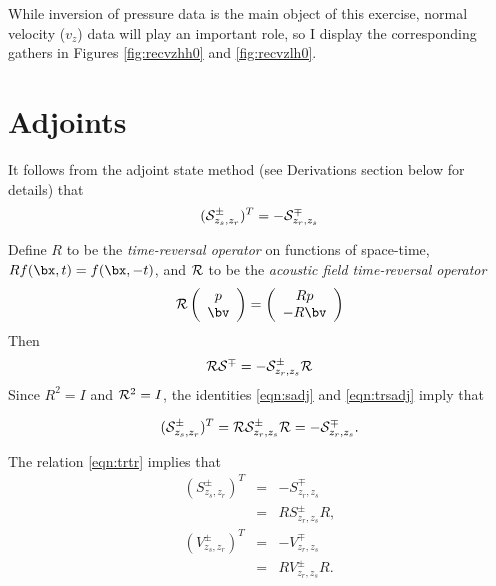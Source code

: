 While inversion of pressure data is the main object of this exercise,
normal velocity ($v_z$) data will play an important role, so I display
the corresponding gathers in Figures \ref{fig:recvzhh0} and \ref{fig:recvzlh0}.



\section{Adjoints}

It follows from the adjoint state method (see Derivations section
below for details) that
\begin{equation}
  \label{eqn:sadj1}
  ({\cal S}^{\pm}_{z_s, z_r})^T = -{\cal S}^{\mp}_{z_r,z_s}
\end{equation}

Define $R$ to be the {\em time-reversal operator} on functions of
space-time, $Rf(\bx,t) = f(\bx,-t)$, and ${\cal R}$ to be the {\em
  acoustic field time-reversal operator}
\begin{equation}
  \label{eqn:trdef}
  {\cal R} \left(
    \begin{array}{c}
      p\\
      \bv
    \end{array}
  \right) =
  \left(
    \begin{array}{c}
      Rp\\
      -R\bv
    \end{array}
  \right)
\end{equation}
Then 
\begin{equation}
  \label{eqn:trsadj}
  {\cal R}{\cal S}^{\mp} = -{\cal S}^{\pm}_{z_r,z_s}{\cal R}
\end{equation}
Since $R^2 = I$ and ${\cal R}^2 = I$, the identities \ref{eqn:sadj} and \ref{eqn:trsadj} imply that

\begin{equation} 
  \label{eqn:trtr}
 ({\cal S}^{\pm}_{z_s,z_r})^T = {\cal R}{\cal S}_{z_r,z_s}^{\pm}{\cal R}=
 -{\cal S}^{\mp}_{z_r,z_s}.
\end{equation}

The relation \ref{eqn:trtr} implies that
\begin{eqnarray}
  (S^{\pm}_{z_s,z_r})^T &=& -S^{\mp}_{z_r,z_s} \nonumber\\
                        &=& R S^{\pm}_{z_r,z_s}R, \nonumber\\
    (V^{\pm}_{z_s,z_r})^T &=& -V^{\mp}_{z_r,z_s} \nonumber\\
                        &=& R V^{\pm}_{z_r,z_s}R.
                            \label{eqn:trtrcomp}
\end{eqnarray}

